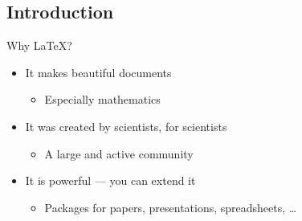 \subsection{Introduction}

\begin{frame}{Why \LaTeX{}?}
    \begin{itemize}
        \item It makes beautiful documents
              \begin{itemize}
                  \item Especially mathematics
              \end{itemize}
        \item It was created by scientists, for scientists
              \begin{itemize}
                  \item A large and active community
              \end{itemize}
        \item It is powerful --- you can extend it
              \begin{itemize}
                  \item Packages for papers, presentations, spreadsheets, \ldots
              \end{itemize}
    \end{itemize}
\end{frame}


